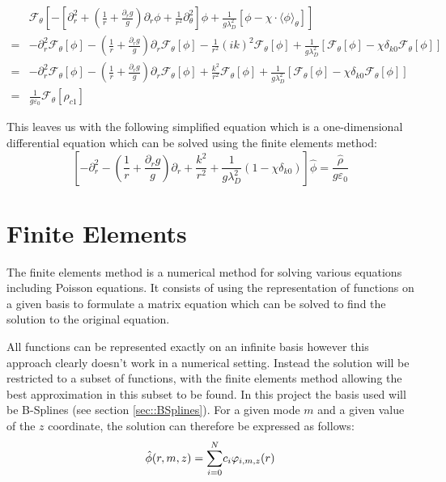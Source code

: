 \begin{align*}
 &\mathcal{F}_\theta\left[-\left[\partial_r^2+\left(\frac{1}{r}+\frac{\partial_rg}{g}\right)\partial_r\phi+\frac{1}{r^2}\partial_\theta^2\right]\phi+\frac{1}{g\lambda_D^2}\left[\phi-\chi\cdot\langle\phi\rangle_\theta\right]\right]\\
 =&-\partial_r^2\mathcal{F}_\theta\left[\phi\right] - \left(\frac{1}{r}+\frac{\partial_rg}{g}\right)\partial_r\mathcal{F}_\theta\left[\phi\right]-\frac{1}{r^2}(ik)^2\mathcal{F}_\theta\left[\phi\right]+\frac{1}{g\lambda_D^2}\left[\mathcal{F}_\theta\left[\phi\right]-\chi\delta_{k0}\mathcal{F}_\theta\left[\phi\right]\right]\\
 =&-\partial_r^2\mathcal{F}_\theta\left[\phi\right] - \left(\frac{1}{r}+\frac{\partial_rg}{g}\right)\partial_r\mathcal{F}_\theta\left[\phi\right]+\frac{k^2}{r^2}\mathcal{F}_\theta\left[\phi\right]+\frac{1}{g\lambda_D^2}\left[\mathcal{F}_\theta\left[\phi\right]-\chi\delta_{k0}\mathcal{F}_\theta\left[\phi\right]\right]\\
 =&\frac{1}{g\varepsilon_0}\mathcal{F}_\theta\left[\rho_{c1}\right]
\end{align*}

This leaves us with the following simplified equation which is a one-dimensional differential equation which can be solved using the finite elements method:
\begin{equation}\label{eq::quasi neutrality fourier}
 \left[-\partial_r^2 - \left(\frac{1}{r}+\frac{\partial_rg}{g}\right)\partial_r+\frac{k^2}{r^2}+\frac{1}{g\lambda_D^2}(1-\chi\delta_{k0})\right] \hat{\phi}=\frac{\hat{\rho}}{g\varepsilon_0}
\end{equation}

\section{Finite Elements}\label{sec::FE}

The finite elements method is a numerical method for solving various equations including Poisson equations. It consists of using the representation of functions on a given basis to formulate a matrix equation which can be solved to find the solution to the original equation.

All functions can be represented exactly on an infinite basis however this approach clearly doesn't work in a numerical setting. Instead the solution will be restricted to a subset of functions, with the finite elements method allowing the best approximation in this subset to be found. In this project the basis used will be B-Splines (see section \ref{sec::BSplines}). For a given mode $m$ and a given value of the $z$ coordinate, the solution can therefore be expressed as follows:
\begin{equation}\label{eq::FE discretisation}
\hat{\phi}(r,m,z)=\underset{i=0}{\overset{N}{\sum}}c_i\varphi_{i,m,z}(r)
\end{equation}

